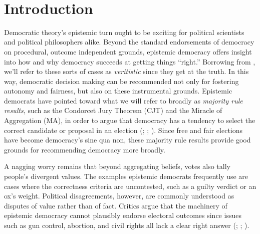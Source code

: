 \documentclass[11pt]{article}
\begin{document}
\ \\
\section{Introduction}
Democratic theory's epistemic turn ought to be exciting for political scientists and political philosophers alike. Beyond the standard endorsements of democracy on procedural, outcome independent grounds, epistemic democracy offers insight into how and why democracy succeeds at getting things ``right.'' Borrowing from  \cite{Goldman99}, we'll refer to these sorts of cases as \emph{veritistic} since they get at the truth. In this way, democratic decision making can be recommended not only for fostering autonomy and fairness, but also on these instrumental grounds. Epistemic democrats have pointed toward what we will refer to broadly as \emph{majority rule results}, such as the Condorcet Jury Theorem (CJT) and the Miracle of Aggregation (MA), in order to argue that democracy has a tendency to select the correct candidate or proposal in an election (\citet{Landemore13}; \cite{Surowiecki2004}; \cite{List2001}). Since free and fair elections have become democracy's sine qua non, these majority rule results provide good grounds for recommending democracy more broadly.


A nagging worry remains that beyond aggregating beliefs, votes also tally people's divergent values. The examples epistemic democrats frequently use are cases where the correctness criteria are uncontested, such as a guilty verdict or an ox's weight. Political disagreements, however, are commonly understood as disputes of value rather than of fact. Critics argue that the machinery of epistemic democracy cannot plausibly endorse electoral outcomes since issues such as gun control, abortion, and civil rights all lack a clear right answer (\citet{Anderson2006}; \citet{Ingham2013}; \cite{urbinati2014democracy}).
\end{document}
